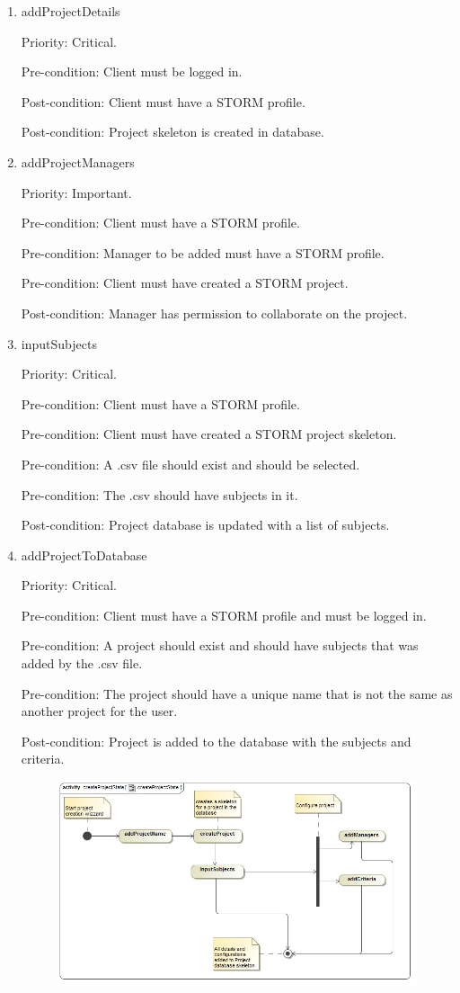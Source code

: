 \begin{enumerate}
\item addProjectDetails\par
Priority: Critical.\par
Pre-condition: Client must be logged in.\par
Post-condition: Client must have a STORM profile.\par
Post-condition: Project skeleton is created in database.\par
\item addProjectManagers\par
Priority: Important.\par
Pre-condition: Client must have a STORM profile.\par
Pre-condition: Manager to be added must have a STORM profile.\par
Pre-condition: Client must have created a STORM project.\par
Post-condition: Manager has permission to collaborate on the project.\par
\item inputSubjects\par
Priority: Critical.\par
Pre-condition: Client must have a STORM profile.\par
Pre-condition: Client must have created a STORM project skeleton.\par
Pre-condition: A .csv file should exist and should be selected.\par
Pre-condition: The .csv should have subjects in it.\par
Post-condition: Project database is updated with a list of subjects.\par
\item addProjectToDatabase\par
Priority: Critical.\par
Pre-condition: Client must have a STORM profile and must be logged in.\par
Pre-condition: A project should exist and should have subjects that was added by the .csv file.\par
Pre-condition: The project should have a unique name that is not the same as another project for the user.\par
Post-condition: Project is added to the database with the subjects and criteria.\par
\begin{figure}[H]
    \centering
    \includegraphics[width=15cm]{./graphics/createProjectState.jpg}

\end{figure}
\end{enumerate}
